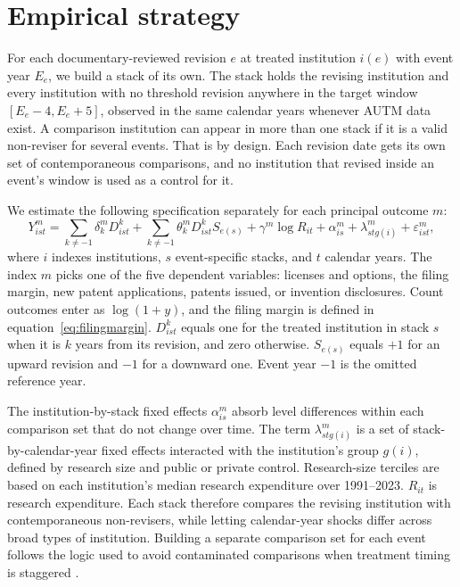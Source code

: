 \section{Empirical strategy}\label{sec:strategy}

For each documentary-reviewed revision $e$ at treated institution $i(e)$ with event year $E_e$, we build a stack of its own. The stack holds the revising institution and every institution with no threshold revision anywhere in the target window $[E_e-4,E_e+5]$, observed in the same calendar years whenever AUTM data exist. A comparison institution can appear in more than one stack if it is a valid non-reviser for several events. That is by design. Each revision date gets its own set of contemporaneous comparisons, and no institution that revised inside an event's window is used as a control for it.

We estimate the following specification separately for each principal outcome $m$:
\begin{equation}
Y^{m}_{ist}
=
\sum_{k\neq-1}\delta^{m}_k D^k_{ist}
+
\sum_{k\neq-1}\theta^{m}_k D^k_{ist}S_{e(s)}
+
\gamma^{m}\log R_{it}
+
\alpha^{m}_{is}
+
\lambda^{m}_{stg(i)}
+
\varepsilon^{m}_{ist},
\label{eq:stacked}
\end{equation}
where $i$ indexes institutions, $s$ event-specific stacks, and $t$ calendar years. The index $m$ picks one of the five dependent variables: licenses and options, the filing margin, new patent applications, patents issued, or invention disclosures. Count outcomes enter as $\log(1+y)$, and the filing margin is defined in equation~\eqref{eq:filingmargin}. $D^k_{ist}$ equals one for the treated institution in stack $s$ when it is $k$ years from its revision, and zero otherwise. $S_{e(s)}$ equals $+1$ for an upward revision and $-1$ for a downward one. Event year $-1$ is the omitted reference year.

The institution-by-stack fixed effects $\alpha^{m}_{is}$ absorb level differences within each comparison set that do not change over time. The term $\lambda^{m}_{stg(i)}$ is a set of stack-by-calendar-year fixed effects interacted with the institution's group $g(i)$, defined by research size and public or private control. Research-size terciles are based on each institution's median research expenditure over 1991--2023. $R_{it}$ is research expenditure. Each stack therefore compares the revising institution with contemporaneous non-revisers, while letting calendar-year shocks differ across broad types of institution. Building a separate comparison set for each event follows the logic used to avoid contaminated comparisons when treatment timing is staggered \citep{GoodmanBacon2021,CallawaySantAnna2021,SunAbraham2021,CengizEtAl2019}.

